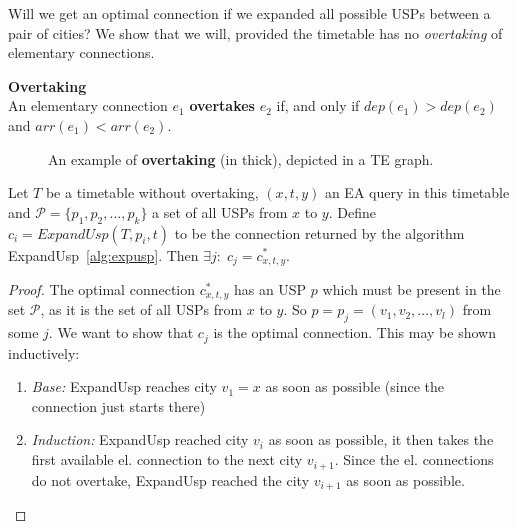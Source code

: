 	\noindent Will we get an optimal connection if we expanded all possible USPs between a pair of cities? We show that we will, provided the timetable has no \textit{overtaking} of elementary connections.
	
	\begin{definition}
        \textbf{Overtaking} \\
		An elementary connection $e_{1}$ \textbf{overtakes} $e_{2}$ if, and only if $dep(e_{1}) > dep(e_{2})$ and $arr(e_{1}) < arr(e_{2})$. 
    \end{definition}
    
    \begin{figure}[h!]
		\begin{center}
		\end{center}
		\caption{\label{fig:overtake} An example of \textcolor{green!80!black}{\textbf{overtaking}} (in thick), depicted in a TE graph.}
	\end{figure}
    
    \begin{lemma}
    	\label{lemma:expandusp}
    	Let $T$ be a timetable without overtaking, $(x, t, y)$ an EA query in this timetable and $\mathcal{P} = \{p_{1}, p_{2}, ..., p_{k}\}$ a set of all USPs from $x$ to $y$. Define $c_{i} = ExpandUsp(T, p_{i}, t)$ to be the connection returned by the algorithm ExpandUsp~\ref{alg:expusp}. Then $\exists j:\; c_{j} = c_{x, t, y}^{*}$.
    \end{lemma}
    \begin{proof}
    	The optimal connection $c_{x, t, y}^{*}$ has an USP $p$ which must be present in the set $\mathcal{P}$, as it is the set of all USPs from $x$ to $y$. So $p = p_{j} = (v_{1}, v_{2},..., v_{l})$ from some $j$. We want to show that $c_{j}$ is the optimal connection. This may be shown inductively:
    	\begin{enumerate}
    		\item \textit{Base:} ExpandUsp reaches city $v_{1} = x$ as soon as possible (since the connection just starts there)
    		\item \textit{Induction:} ExpandUsp reached city $v_{i}$ as soon as possible, it then takes the first available el. connection to the next city $v_{i + 1}$. Since the el. connections do not overtake, ExpandUsp reached the city $v_{i + 1}$ as soon as possible.
    	\end{enumerate}
    \end{proof}
    
